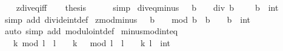 \begin{isabellebody}
\ \ \isamarkupfalse%
\ zdiv{\isacharunderscore}{\kern0pt}eq{\isacharunderscore}{\kern0pt}{}{\isacharunderscore}{\kern0pt}iff\isanewline
\ \ \isamarkupfalse%
\ {\isacharquery}{\kern0pt}thesis\isanewline
\ \ \ \ \isamarkupfalse%
\ simp\isanewline
{}\isamarkupfalse%
%
\endisatagproof
{\isafoldproof}%
%
\isadelimproof
%
\endisadelimproof
%
\isadelimdocument
%
\endisadelimdocument
%
\isatagdocument
%
\isamarkuptrue%
%
\endisatagdocument
{\isafolddocument}%
%
\isadelimdocument
%
\endisadelimdocument
{}\isamarkupfalse%
\ div{\isacharunderscore}{\kern0pt}eq{\isacharunderscore}{\kern0pt}minus{}{\isacharcolon}{\kern0pt}\ {\isachardoublequoteopen}{}\ {\isacharless}{\kern0pt}\ b\ {\isasymLongrightarrow}\ {\isacharminus}{\kern0pt}\ {}\ div\ b\ {\isacharequal}{\kern0pt}\ {\isacharminus}{\kern0pt}\ {}{\isachardoublequoteclose}\ \ b\ {\isacharcolon}{\kern0pt}{\isacharcolon}{\kern0pt}\ int\isanewline
%
\isadelimproof
\ \ %
\endisadelimproof
%
\isatagproof
{}\isamarkupfalse%
\ {\isacharparenleft}{\kern0pt}simp\ add{\isacharcolon}{\kern0pt}\ divide{\isacharunderscore}{\kern0pt}int{\isacharunderscore}{\kern0pt}def{\isacharparenright}{\kern0pt}%
\endisatagproof
{\isafoldproof}%
%
\isadelimproof
\isanewline
%
\endisadelimproof
\isanewline
{}\isamarkupfalse%
\ zmod{\isacharunderscore}{\kern0pt}minus{}{\isacharcolon}{\kern0pt}\ {\isachardoublequoteopen}{}\ {\isacharless}{\kern0pt}\ b\ {\isasymLongrightarrow}\ {\isacharminus}{\kern0pt}\ {}\ mod\ b\ {\isacharequal}{\kern0pt}\ b\ {\isacharminus}{\kern0pt}\ {}{\isachardoublequoteclose}\ \ b\ {\isacharcolon}{\kern0pt}{\isacharcolon}{\kern0pt}\ int\isanewline
%
\isadelimproof
\ \ %
\endisadelimproof
%
\isatagproof
{}\isamarkupfalse%
\ {\isacharparenleft}{\kern0pt}auto\ simp\ add{\isacharcolon}{\kern0pt}\ modulo{\isacharunderscore}{\kern0pt}int{\isacharunderscore}{\kern0pt}def{\isacharparenright}{\kern0pt}%
\endisatagproof
{\isafoldproof}%
%
\isadelimproof
\isanewline
%
\endisadelimproof
\isanewline
{}\isamarkupfalse%
\ minus{\isacharunderscore}{\kern0pt}mod{\isacharunderscore}{\kern0pt}int{\isacharunderscore}{\kern0pt}eq{\isacharcolon}{\kern0pt}\isanewline
\ \ {\isacartoucheopen}{\isacharminus}{\kern0pt}\ k\ mod\ l\ {\isacharequal}{\kern0pt}\ l\ {\isacharminus}{\kern0pt}\ {}\ {\isacharminus}{\kern0pt}\ {\isacharparenleft}{\kern0pt}k\ {\isacharminus}{\kern0pt}\ {}{\isacharparenright}{\kern0pt}\ mod\ l{\isacartoucheclose}\ \ {\isacartoucheopen}l\ {\isasymge}\ {}{\isacartoucheclose}\ \ k\ l\ {\isacharcolon}{\kern0pt}{\isacharcolon}{\kern0pt}\ int\isanewline

\end{isabellebody}
